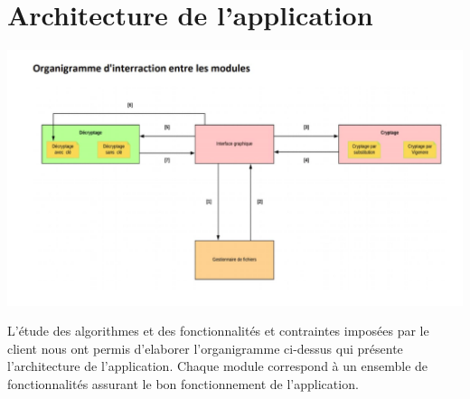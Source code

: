 \documentclass[11pt]{article}
\begin{document}
\section{Architecture de l'application}

\hspace{0.5cm}
\begin{center}\includegraphics[scale=0.50]{pictures/Organigramme.png}\end{center}
\newpage
L'étude des algorithmes et des fonctionnalités et contraintes imposées par le client nous ont permis d'elaborer l'organigramme  ci-dessus qui présente l’architecture de l’application. Chaque module correspond à un ensemble de fonctionnalités assurant le bon fonctionnement de l’application. 
\end{document}
